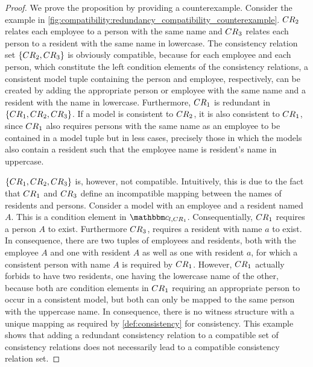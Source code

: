 \begin{proof}
We prove the proposition by providing a counterexample. %
Consider the example in \autoref{fig:compatibility:redundancy_compatibility_counterexample}. 
$\consistencyrelation{CR}{2}$ relates each employee to a person with the same name and $\consistencyrelation{CR}{3}$ relates each person to a resident with the same name in lowercase.
The consistency relation set $\setted{\consistencyrelation{CR}{2}, \consistencyrelation{CR}{3}}$ is obviously compatible, because for each employee and each person, which constitute the left condition elements of the consistency relations, a consistent model tuple containing the person and employee, respectively, can be created by adding the appropriate person or employee with the same name and a resident with the name in lowercase.
Furthermore, $\consistencyrelation{CR}{1}$ is redundant in $\setted{\consistencyrelation{CR}{1}, \consistencyrelation{CR}{2}, \consistencyrelation{CR}{3}}$.
If a model is consistent to $\consistencyrelation{CR}{2}$, it is also consistent to $\consistencyrelation{CR}{1}$, since $\consistencyrelation{CR}{1}$ also requires persons with the same name as an employee to be contained in a model tuple but in less cases, precisely those in which the models also contain a resident such that the employee name is resident's name in uppercase.

$\setted{\consistencyrelation{CR}{1}, \consistencyrelation{CR}{2}, \consistencyrelation{CR}{3}}$ is, however, not compatible.
Intuitively, this is due to the fact that $\consistencyrelation{CR}{1}$ and $\consistencyrelation{CR}{3}$ define an incompatible mapping between the names of residents and persons.
Consider a model with an employee and a resident named $A$. This is a condition element in $\condition{c}{l,\consistencyrelation{CR}{1}}$. 
Consequentially, $\consistencyrelation{CR}{1}$ requires a person $A$ to exist. Furthermore $\consistencyrelation{CR}{3}$, requires a resident with name $a$ to exist.
In consequence, there are two tuples of employees and residents, both with the employee $A$ and one with resident $A$ as well as one with resident $a$, for which a consistent person with name $A$ is required by $\consistencyrelation{CR}{1}$.
However, $\consistencyrelation{CR}{1}$ actually forbids to have two residents, one having the lowercase name of the other, because both are condition elements in $\consistencyrelation{CR}{1}$ requiring an appropriate person to occur in a consistent model, but both can only be mapped to the same person with the uppercase name.
In consequence, there is no witness structure with a unique mapping as required by \autoref{def:consistency} for consistency.
This example shows that adding a redundant consistency relation to a compatible set of consistency relations does not necessarily lead to a compatible consistency relation set.
\end{proof}



